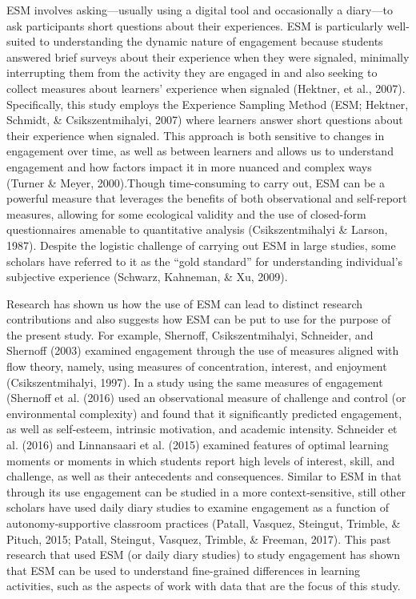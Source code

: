\documentclass[]{msu-thesis}
\theoremstyle{definition}
\theoremstyle{definition}
\theoremstyle{definition}
\theoremstyle{remark}
\begin{document}
ESM involves asking---usually using a digital tool and occasionally a
diary---to ask participants short questions about their experiences. ESM
is particularly well-suited to understanding the dynamic nature of
engagement because students answered brief surveys about their
experience when they were signaled, minimally interrupting them from the
activity they are engaged in and also seeking to collect measures about
learners' experience when signaled (Hektner, et al., 2007).
Specifically, this study employs the Experience Sampling Method (ESM;
Hektner, Schmidt, \& Csikszentmihalyi, 2007) where learners answer short
questions about their experience when signaled. This approach is both
sensitive to changes in engagement over time, as well as between
learners and allows us to understand engagement and how factors impact
it in more nuanced and complex ways (Turner \& Meyer, 2000).Though
time-consuming to carry out, ESM can be a powerful measure that
leverages the benefits of both observational and self-report measures,
allowing for some ecological validity and the use of closed-form
questionnaires amenable to quantitative analysis (Csikszentmihalyi \&
Larson, 1987). Despite the logistic challenge of carrying out ESM in
large studies, some scholars have referred to it as the ``gold
standard'' for understanding individual's subjective experience
(Schwarz, Kahneman, \& Xu, 2009).

Research has shown us how the use of ESM can lead to distinct research
contributions and also suggests how ESM can be put to use for the
purpose of the present study. For example, Shernoff, Csikszentmihalyi,
Schneider, and Shernoff (2003) examined engagement through the use of
measures aligned with flow theory, namely, using measures of
concentration, interest, and enjoyment (Csikszentmihalyi, 1997). In a
study using the same measures of engagement (Shernoff et al. (2016) used
an observational measure of challenge and control (or environmental
complexity) and found that it significantly predicted engagement, as
well as self-esteem, intrinsic motivation, and academic intensity.
Schneider et al. (2016) and Linnansaari et al. (2015) examined features
of optimal learning moments or moments in which students report high
levels of interest, skill, and challenge, as well as their antecedents
and consequences. Similar to ESM in that through its use engagement can
be studied in a more context-sensitive, still other scholars have used
daily diary studies to examine engagement as a function of
autonomy-supportive classroom practices (Patall, Vasquez, Steingut,
Trimble, \& Pituch, 2015; Patall, Steingut, Vasquez, Trimble, \&
Freeman, 2017). This past research that used ESM (or daily diary
studies) to study engagement has shown that ESM can be used to
understand fine-grained differences in learning activities, such as the
aspects of work with data that are the focus of this study.
\end{document}

